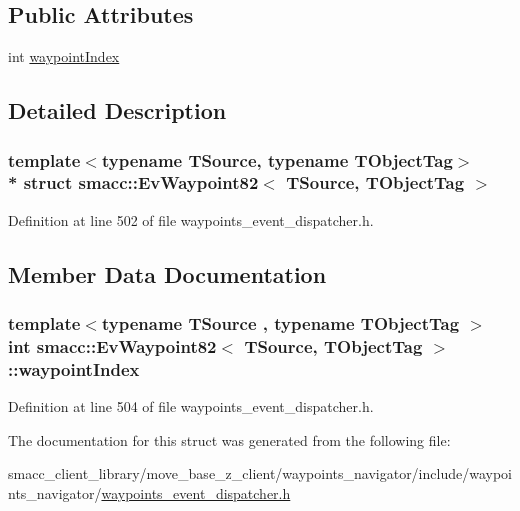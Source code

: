 \subsection*{Public Attributes}
\begin{DoxyCompactItemize}
\item 
int \hyperlink{structsmacc_1_1EvWaypoint82_a1ce3135964385fe29021cbe0bc3079fe}{waypoint\+Index}
\end{DoxyCompactItemize}


\subsection{Detailed Description}
\subsubsection*{template$<$typename T\+Source, typename T\+Object\+Tag$>$\\*
struct smacc\+::\+Ev\+Waypoint82$<$ T\+Source, T\+Object\+Tag $>$}



Definition at line 502 of file waypoints\+\_\+event\+\_\+dispatcher.\+h.



\subsection{Member Data Documentation}
\subsubsection[{\texorpdfstring{waypoint\+Index}{waypointIndex}}]{\setlength{\rightskip}{0pt plus 5cm}template$<$typename T\+Source , typename T\+Object\+Tag $>$ int {\bf smacc\+::\+Ev\+Waypoint82}$<$ T\+Source, T\+Object\+Tag $>$\+::waypoint\+Index}\hypertarget{structsmacc_1_1EvWaypoint82_a1ce3135964385fe29021cbe0bc3079fe}{}\label{structsmacc_1_1EvWaypoint82_a1ce3135964385fe29021cbe0bc3079fe}


Definition at line 504 of file waypoints\+\_\+event\+\_\+dispatcher.\+h.



The documentation for this struct was generated from the following file\+:\begin{DoxyCompactItemize}
\item 
smacc\+\_\+client\+\_\+library/move\+\_\+base\+\_\+z\+\_\+client/waypoints\+\_\+navigator/include/waypoints\+\_\+navigator/\hyperlink{waypoints__event__dispatcher_8h}{waypoints\+\_\+event\+\_\+dispatcher.\+h}\end{DoxyCompactItemize}
